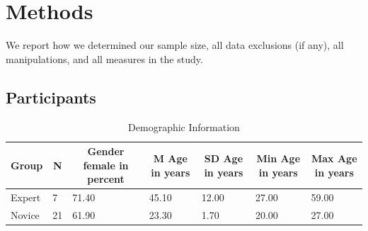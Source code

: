\documentclass[
  man,floatsintext]{apa6}
\begin{document}
\hypertarget{methods}{%
\section{Methods}\label{methods}}

We report how we determined our sample size, all data exclusions (if any), all manipulations, and all measures in the study.

\hypertarget{participants}{%
\subsection{Participants}\label{participants}}

\begin{table}[h]

\begin{center}
\begin{threeparttable}

\caption{\label{tab:demographicstable}Demographic Information}

\tiny{

\begin{tabular}{lllllll}
\toprule
Group & \multicolumn{1}{c}{N} & \multicolumn{1}{c}{Gender female in percent} & \multicolumn{1}{c}{M Age in years} & \multicolumn{1}{c}{SD Age in years} & \multicolumn{1}{c}{Min Age in years} & \multicolumn{1}{c}{Max Age in years}\\
\midrule
Expert & 7 & 71.40 & 45.10 & 12.00 & 27.00 & 59.00\\
Novice & 21 & 61.90 & 23.30 & 1.70 & 20.00 & 27.00\\
\bottomrule
\end{tabular}

}

\end{threeparttable}
\end{center}

\end{table}
\end{document}
